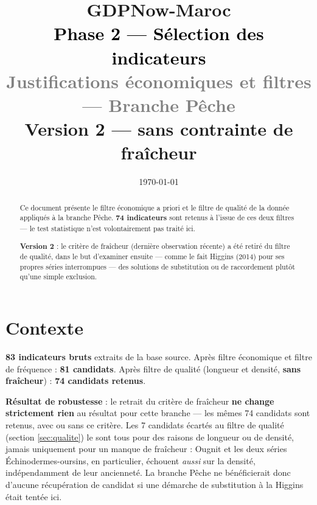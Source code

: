 \documentclass[11pt,a4paper]{article}
\title{\vspace{-1.3cm}\textcolor{bleuprincip}{\Huge\bfseries GDPNow-Maroc}\\[0.3cm]
\textcolor{black}{\Large Phase 2 --- Sélection des indicateurs}\\[0.15cm]
\textcolor{gray}{\large Justifications économiques et filtres --- Branche Pêche}\\[0.1cm]
\textcolor{orangealerte}{\normalsize Version 2 --- sans contrainte de fraîcheur}}
\author{}
\date{\today}
\begin{document}
\maketitle
\thispagestyle{empty}

\begin{abstract}
\noindent Ce document présente le filtre économique a priori et le filtre de qualité de la donnée appliqués à la branche Pêche. \textbf{74 indicateurs} sont retenus à l'issue de ces deux filtres --- le test statistique n'est volontairement pas traité ici.

\textbf{Version 2} : le critère de fraîcheur (dernière observation récente) a été retiré du filtre de qualité, dans le but d'examiner ensuite --- comme le fait Higgins (2014) pour ses propres séries interrompues --- des solutions de substitution ou de raccordement plutôt qu'une simple exclusion.
\end{abstract}

\tableofcontents
\vspace{0.3cm}

\section{Contexte}

\begin{fichebox}
\textbf{83 indicateurs bruts} extraits de la base source. Après filtre économique et filtre de fréquence : \textbf{81 candidats}. Après filtre de qualité (longueur et densité, \textbf{sans fraîcheur}) : \textbf{74 candidats retenus}.
\end{fichebox}

\begin{noteboxbleu}
\textbf{Résultat de robustesse} : le retrait du critère de fraîcheur \textbf{ne change strictement rien} au résultat pour cette branche --- les mêmes 74 candidats sont retenus, avec ou sans ce critère. Les 7 candidats écartés au filtre de qualité (section \ref{sec:qualite}) le sont tous pour des raisons de longueur ou de densité, jamais uniquement pour un manque de fraîcheur : Ougnit et les deux séries Échinodermes-oursins, en particulier, échouent \emph{aussi} sur la densité, indépendamment de leur ancienneté. La branche Pêche ne bénéficierait donc d'aucune récupération de candidat si une démarche de substitution à la Higgins était tentée ici.
\end{noteboxbleu}
\end{document}

